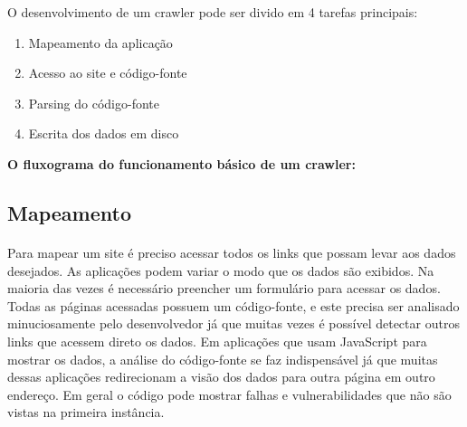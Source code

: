 \documentclass[a4paper, 12pt]{article}
\begin{document}
O desenvolvimento de um crawler pode ser divido em 4 tarefas principais:

\begin{enumerate}
\item Mapeamento da aplicação
\item Acesso ao site e código-fonte
\item Parsing do código-fonte
\item Escrita dos dados em disco
\end{enumerate}

{\bf O fluxograma do funcionamento básico de um crawler:}
\\



\subsection{Mapeamento}\label{map}
\paragraph{}Para mapear um site é preciso acessar todos os links que
possam levar aos dados desejados. As aplicações podem variar o modo
que os dados são exibidos. Na maioria das vezes é necessário preencher
um formulário para acessar os dados. Todas as páginas acessadas
possuem um código-fonte, e este precisa ser analisado minuciosamente
pelo desenvolvedor já que muitas vezes é possível detectar outros
links que acessem direto os dados. Em aplicações que usam JavaScript
para mostrar os dados, a análise do código-fonte se faz indispensável
já que muitas dessas aplicações redirecionam a visão dos dados para
outra página em outro endereço. Em geral o código pode mostrar falhas
e vulnerabilidades que não são vistas na primeira instância.
\end{document}
